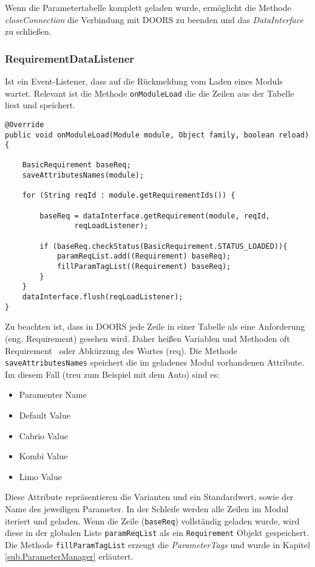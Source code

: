 Wenn die Parametertabelle komplett geladen wurde, ermöglicht die Methode \textit{closeConnection} die Verbindung mit DOORS zu beenden und das \textit{DataInterface} zu schließen.





\subsubsection{RequirementDataListener}\label{sub.RequirementDataListener}

Ist ein Event-Listener, dass auf die Rückmeldung vom Laden eines Moduls wartet. Relevant ist die Methode \texttt{onModuleLoad} die die Zeilen aus der Tabelle liest und speichert.\\

\begin{lstlisting}[caption={Laden der Parametertabelle nach Zeilen}, captionpos=b]
@Override
public void onModuleLoad(Module module, Object family, boolean reload){

	BasicRequirement baseReq;
	saveAttributesNames(module);
				
	for (String reqId : module.getRequirementIds()) {

		baseReq = dataInterface.getRequirement(module, reqId,
				reqLoadListener);

		if (baseReq.checkStatus(BasicRequirement.STATUS_LOADED)){
			paramReqList.add((Requirement) baseReq);
			fillParamTagList((Requirement) baseReq);
		}
	}
	dataInterface.flush(reqLoadListener);
}
\end{lstlisting}

Zu beachten ist, dass in DOORS jede Zeile in einer Tabelle als eine Anforderung (eng. Requirement) gesehen wird. Daher heißen Variablen und Methoden oft \glqq Requirement\grqq~ oder Abkürzung des Wortes (req). Die Methode \texttt{saveAttributesNames} speichert die im geladenes Modul vorhandenen Attribute. Im diesem Fall (treu zum Beispiel mit dem Auto) sind es:

\begin{itemize}\itemsep1pt
\item Paramenter Name
\item Default Value
\item Cabrio Value
\item Kombi Value
\item Limo Value
\end{itemize}

Diese Attribute repräsentieren die Varianten und ein Standardwert, sowie der Name des jeweiligen Parameter. In der Schleife werden alle Zeilen im Modul iteriert und geladen. Wenn die Zeile (\texttt{baseReq}) vollständig geladen wurde, wird diese in der globalen Liste \texttt{paramReqList} als ein \texttt{Requirement} Objekt gespeichert. Die Methode \texttt{fillParamTagList} erzeugt die \textit{ParameterTags} und wurde in Kapitel \ref{sub.ParameterManager} erläutert.\\

